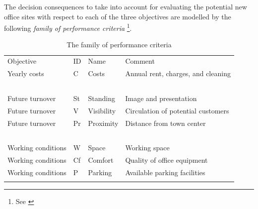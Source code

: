 The decision consequences to take into account for evaluating the potential new office sites with respect to each of the three objectives are modelled by the following \emph{family of performance criteria} \footnote{See \citealp{ROY-2000}}.
\begin{table}[h]
\caption{The family of performance criteria}
\label{tab:6.2}       %
\begin{center}
    \begin{tabular}{l|l|l|l}
      \svhline\noalign{\smallskip}
      Objective & ID & Name &  Comment\\
      \noalign{\smallskip}\hline\noalign{\smallskip}
    Yearly costs  &       C &   Costs &       Annual rent, charges, and cleaning\\
    \             &  \      & \        &  \ \\
    Future turnover   &   St &   Standing &    Image and presentation\\
    Future turnover   &   V  &  Visibility &  Circulation of potential customers \\
    Future turnover   &   Pr  & Proximity  &  Distance from town center\\
    \                 &   \   & \          &  \  \\
    Working conditions &  W  &  Space   &     Working space\\
    Working conditions &  Cf &  Comfort  &    Quality of office equipment\\
    Working conditions &  P  &  Parking  &    Available parking facilities\\
      \noalign{\smallskip}\hline
    \end{tabular}   
  \end{center}
\end{table}

